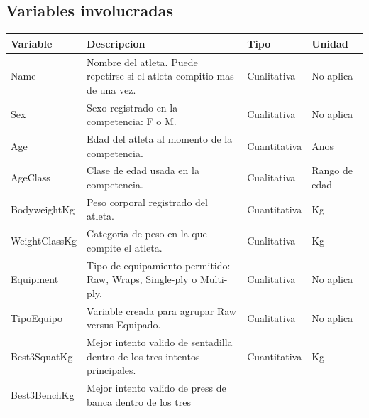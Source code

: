 \documentclass[
  spanish,
]{article}
\begin{document}
\subsection{Variables involucradas}\label{variables-involucradas}

\begin{longtable}[]{@{}
  >{\raggedright\arraybackslash}p{}
  >{\raggedright\arraybackslash}p{}
  >{\raggedright\arraybackslash}p{}
  >{\raggedright\arraybackslash}p{}@{}}
\toprule\noalign{}
\begin{minipage}[b]{\linewidth}\raggedright
Variable
\end{minipage} & \begin{minipage}[b]{\linewidth}\raggedright
Descripcion
\end{minipage} & \begin{minipage}[b]{\linewidth}\raggedright
Tipo
\end{minipage} & \begin{minipage}[b]{\linewidth}\raggedright
Unidad
\end{minipage} \\
\midrule\noalign{}
\endhead
\bottomrule\noalign{}
\endlastfoot
Name & Nombre del atleta. Puede repetirse si el atleta compitio mas de
una vez. & Cualitativa & No aplica \\
Sex & Sexo registrado en la competencia: F o M. & Cualitativa & No
aplica \\
Age & Edad del atleta al momento de la competencia. & Cuantitativa &
Anos \\
AgeClass & Clase de edad usada en la competencia. & Cualitativa & Rango
de edad \\
BodyweightKg & Peso corporal registrado del atleta. & Cuantitativa &
Kg \\
WeightClassKg & Categoria de peso en la que compite el atleta. &
Cualitativa & Kg \\
Equipment & Tipo de equipamiento permitido: Raw, Wraps, Single-ply o
Multi-ply. & Cualitativa & No aplica \\
TipoEquipo & Variable creada para agrupar Raw versus Equipado. &
Cualitativa & No aplica \\
Best3SquatKg & Mejor intento valido de sentadilla dentro de los tres
intentos principales. & Cuantitativa & Kg \\
Best3BenchKg & Mejor intento valido de press de banca dentro de los tres

\end{longtable}
\end{document}
